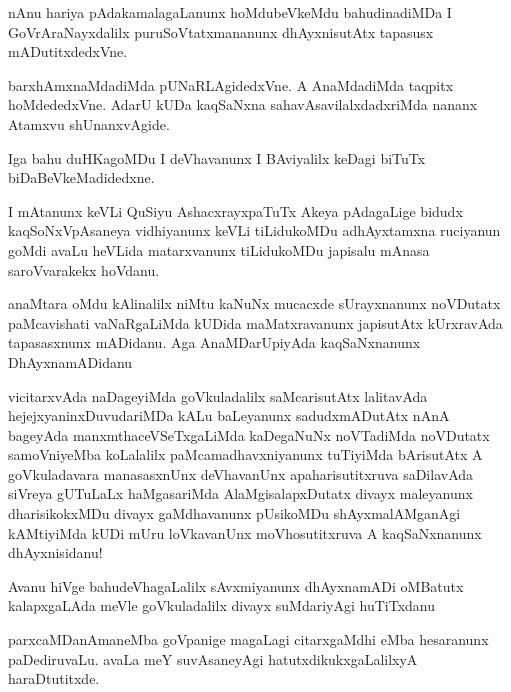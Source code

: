 \documentclass{article}
\begin{document}
\begin{mn}%
nAnu hariya pAdakamalagaLanunx hoMdubeVkeMdu bahudinadiMDa I GoVrAraNayxdalilx 
puruSoVtatxmananunx dhAyxnisutAtx tapasusx mADutitxdedxVne.
\end{mn}

\begin{mn}%
barxhAmxnaMdadiMda pUNaRLAgidedxVne. A AnaMdadiMda taqpitx hoMdededxVne. AdarU kUDa 
kaqSaNxna sahavAsavilalxdadxriMda nananx Atamxvu shUnanxvAgide.
\end{mn}

\begin{mn}%
Iga bahu duHKagoMDu I deVhavanunx I BAviyalilx keDagi biTuTx biDaBeVkeMadidedxne.
\end{mn}

\begin{mn}%
I mAtanunx keVLi QuSiyu AshacxrayxpaTuTx Akeya pAdagaLige bidudx kaqSoNxVpAsaneya 
vidhiyanunx keVLi tiLidukoMDu adhAyxtamxna ruciyanun goMdi avaLu heVLida matarxvanunx 
tiLidukoMDu japisalu mAnasa saroVvarakekx hoVdanu.
\end{mn}

\begin{mn}%
anaMtara oMdu kAlinalilx niMtu kaNuNx mucacxde sUrayxnanunx noVDutatx paMcavishati 
vaNaRgaLiMda kUDida maMatxravanunx japisutAtx kUrxravAda tapasasxnunx mADidanu. Aga 
AnaMDarUpiyAda kaqSaNxnanunx DhAyxnamADidanu
\end{mn}

\begin{mn}%
vicitarxvAda naDageyiMda goVkuladalilx saMcarisutAtx lalitavAda hejejxyaninxDuvudariMDa 
kALu baLeyanunx sadudxmADutAtx nAnA bageyAda manxmthaceVSeTxgaLiMda kaDegaNuNx  noVTadiMda 
noVDutatx samoVniyeMba koLalalilx paMcamadhavxniyanunx tuTiyiMda bArisutAtx A goVkuladavara
manasasxnUnx deVhavanUnx apaharisutitxruva saDilavAda siVreya gUTuLaLx haMgasariMda 
AlaMgisalapxDutatx divayx maleyanunx dharisikokxMDu divayx gaMdhavanunx pUsikoMDu 
shAyxmalAMganAgi kAMtiyiMda kUDi mUru loVkavanUnx moVhosutitxruva A kaqSaNxnanunx 
dhAyxnisidanu!
\end{mn}

\begin{mn}%
Avanu hiVge bahudeVhagaLalilx sAvxmiyanunx dhAyxnamADi oMBatutx kalapxgaLAda meVle 
goVkuladalilx divayx suMdariyAgi huTiTxdanu
\end{mn}

\begin{mn}%
parxcaMDanAmaneMba goVpanige magaLagi citarxgaMdhi eMba hesaranunx paDediruvaLu. avaLa meY 
suvAsaneyAgi hatutxdikukxgaLalilxyA haraDtutitxde.
\end{mn}
\end{document}
